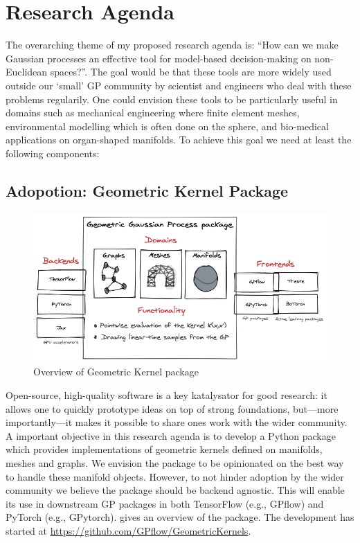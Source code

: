 \section{Research Agenda}
The overarching theme of my proposed research agenda is: ``How can we make Gaussian processes an effective tool for model-based decision-making on non-Euclidean spaces?''. The goal would be that these tools are more widely used outside our `small' GP community by scientist and engineers who deal with these problems regularily. One could envision these tools to be particularly useful in domains such as mechanical engineering where finite element meshes, environmental modelling which is often done on the sphere, and bio-medical applications on organ-shaped manifolds. To achieve this goal we need at least the following components:

\subsection{Adopotion: Geometric Kernel Package}

\begin{figure}
    \centering
    \includegraphics[width=.7\textwidth]{geomgp}
    \caption{Overview of Geometric Kernel package}
    \label{fig:geomgp}
\end{figure}

Open-source, high-quality software is a key katalysator for good research: it allows one to quickly prototype ideas on top of strong foundations, but---more importantly---it makes it possible to share ones work with the wider community. A important objective in this research agenda is to develop a Python package which provides implementations of geometric kernels defined on manifolds, meshes and graphs. We envision the package to be opinionated on the best way to handle these manifold objects. However, to not hinder adoption by the wider community we believe the package should be backend agnostic. This will enable its use in downstream GP packages in both TensorFlow (e.g., GPflow) and PyTorch (e.g., GPytorch).  gives an overview of the package. The development has started at \url{https://github.com/GPflow/GeometricKernels}.

